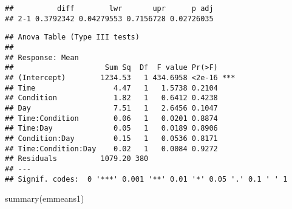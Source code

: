 \documentclass[
]{article}
\newenvironment{Shaded}{\begin{snugshade}}{\end{snugshade}}
\newcommand{\AttributeTok}[1]{\textcolor[rgb]{0.77,0.63,0.00}{#1}}
\newcommand{\CommentTok}[1]{\textcolor[rgb]{0.56,0.35,0.01}{\textit{#1}}}
\newcommand{\FunctionTok}[1]{\textcolor[rgb]{0.00,0.00,0.00}{#1}}
\newcommand{\NormalTok}[1]{#1}
\newcommand{\OtherTok}[1]{\textcolor[rgb]{0.56,0.35,0.01}{#1}}
\newcommand{\SpecialCharTok}[1]{\textcolor[rgb]{0.00,0.00,0.00}{#1}}
\newcommand{\StringTok}[1]{\textcolor[rgb]{0.31,0.60,0.02}{#1}}
\begin{document}
\begin{Shaded}
\end{Shaded}

\begin{verbatim}
##          diff        lwr       upr      p adj
## 2-1 0.3792342 0.04279553 0.7156728 0.02726035
\end{verbatim}

\begin{Shaded}
\end{Shaded}

\begin{verbatim}
## Anova Table (Type III tests)
## 
## Response: Mean
##                     Sum Sq  Df  F value Pr(>F)    
## (Intercept)        1234.53   1 434.6958 <2e-16 ***
## Time                  4.47   1   1.5738 0.2104    
## Condition             1.82   1   0.6412 0.4238    
## Day                   7.51   1   2.6456 0.1047    
## Time:Condition        0.06   1   0.0201 0.8874    
## Time:Day              0.05   1   0.0189 0.8906    
## Condition:Day         0.15   1   0.0536 0.8171    
## Time:Condition:Day    0.02   1   0.0084 0.9272    
## Residuals          1079.20 380                    
## ---
## Signif. codes:  0 '***' 0.001 '**' 0.01 '*' 0.05 '.' 0.1 ' ' 1
\end{verbatim}

\begin{Shaded}
\begin{Highlighting}[]
\FunctionTok{summary}\NormalTok{(emmeans1)}
\end{Highlighting}
\end{Shaded}
\end{document}
